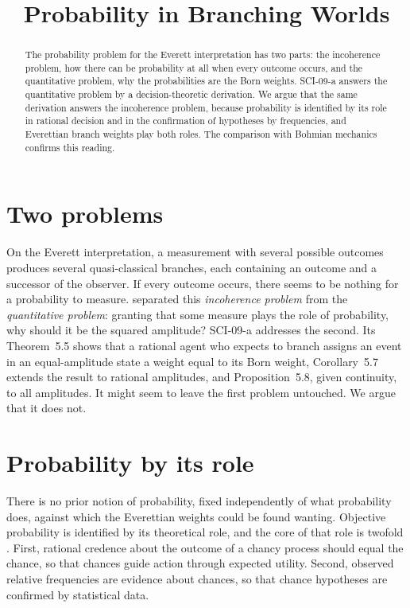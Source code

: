 \documentclass{situationist-preprint}
\title{Probability in Branching Worlds}
\begin{document}
\maketitle

\begin{abstract}
The probability problem for the Everett interpretation has two parts: the incoherence problem, how there can be probability at all when every outcome occurs, and the quantitative problem, why the probabilities are the Born weights. SCI-09-a answers the quantitative problem by a decision-theoretic derivation. We argue that the same derivation answers the incoherence problem, because probability is identified by its role in rational decision and in the confirmation of hypotheses by frequencies, and Everettian branch weights play both roles. The comparison with Bohmian mechanics confirms this reading.
\end{abstract}

\section{Two problems}

On the Everett interpretation, a measurement with several possible outcomes produces several quasi-classical branches, each containing an outcome and a successor of the observer. If every outcome occurs, there seems to be nothing for a probability to measure. \citet{Greaves2004} separated this \emph{incoherence problem} from the \emph{quantitative problem}: granting that some measure plays the role of probability, why should it be the squared amplitude? SCI-09-a addresses the second. Its Theorem~5.5 shows that a rational agent who expects to branch assigns an event in an equal-amplitude state a weight equal to its Born weight, Corollary~5.7 extends the result to rational amplitudes, and Proposition~5.8, given continuity, to all amplitudes. It might seem to leave the first problem untouched. We argue that it does not.

\section{Probability by its role}

There is no prior notion of probability, fixed independently of what probability does, against which the Everettian weights could be found wanting. Objective probability is identified by its theoretical role, and the core of that role is twofold \citep{Lewis1980,Wallace2012}. First, rational credence about the outcome of a chancy process should equal the chance, so that chances guide action through expected utility. Second, observed relative frequencies are evidence about chances, so that chance hypotheses are confirmed by statistical data.
\end{document}
